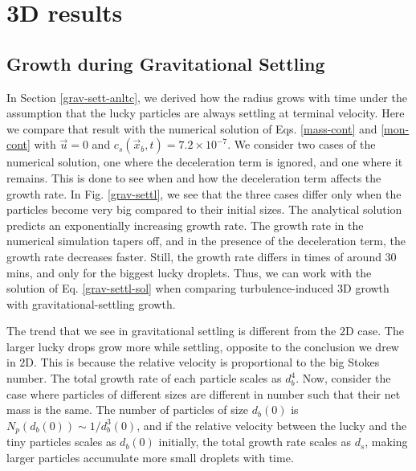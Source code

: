 \documentclass[../Rajarshi-thesis-draft.tex]{subfiles}
\begin{document}
\section{3D results}\label{lck-3d}

\subsection{Growth during Gravitational Settling}
In Section \ref{grav-sett-anltc}, we derived how the radius grows with time under the assumption that the lucky particles are always settling at terminal velocity. Here we compare that result with the numerical solution of Eqs. \ref{mass-cont} and \ref{mon-cont} with $\vec{u} = 0$ and $c_s(\vec{x}_b, t) = 7.2 \times 10^{-7}$. We consider two cases of the numerical solution, one where the deceleration term is ignored, and one where it remains. This is done to see when and how the deceleration term affects the growth rate. In Fig. \ref{grav-settl}, we see that the three cases differ only when the particles become very big compared to their initial sizes. The analytical solution predicts an exponentially increasing growth rate. The growth rate in the numerical simulation tapers off, and in the presence of the deceleration term, the growth rate decreases faster. Still, the growth rate differs in times of around 30 mins, and only for the biggest lucky droplets. Thus, we can work with the solution of Eq. \eqref{grav-settl-sol} when comparing turbulence-induced $3$D growth with gravitational-settling growth.


The trend that we see in gravitational settling is different from the $2$D case. The larger lucky drops grow more while settling, opposite to the conclusion we drew in $2$D. This is because the relative velocity is proportional to the big Stokes number. The total growth rate of each particle scales as $d_b^4$. Now, consider the case where particles of different sizes are different in number such that their net mass is the same.  The number of particles of size $d_b(0)$ is $N_p(d_b(0)) \sim 1/d_b^3(0)$, and if the relative velocity between the lucky and the tiny particles scales as $d_b(0)$ initially, the total growth rate scales as $d_s$, making larger particles accumulate more small droplets with time. 
\end{document}

